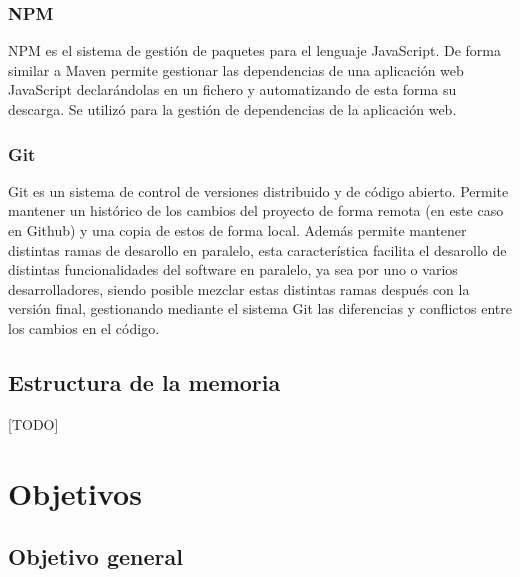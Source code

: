 \documentclass[a4paper, 12pt]{book}
\begin{document}
\subsection{NPM}
\label{subsec:intro_tools_npm}
NPM es el sistema de gestión de paquetes para el lenguaje JavaScript. De forma similar a Maven permite gestionar las dependencias de una aplicación web JavaScript declarándolas en un fichero y automatizando de esta forma su descarga. Se utilizó para la gestión de dependencias de la aplicación web.


\subsection{Git}
\label{subsec:intro_tools_git}
Git es un sistema de control de versiones distribuido y de código abierto. Permite mantener un histórico de los cambios del proyecto de forma remota (en este caso en Github) y una copia de estos de forma local. Además permite mantener distintas ramas de desarollo en paralelo, esta característica facilita el desarollo de distintas funcionalidades del software en paralelo, ya sea por uno o varios desarrolladores, siendo posible mezclar estas distintas ramas después con la versión final, gestionando mediante el sistema Git las diferencias y conflictos entre los cambios en el código.

\section{Estructura de la memoria}
\label{sec:intro_memorystructure}
[TODO]



\cleardoublepage %
\chapter{Objetivos} %
\label{chap:targets} %

\section{Objetivo general} %
\label{sec:targets_generaltarget} %
\end{document}

